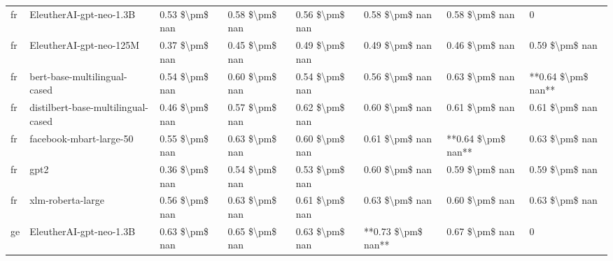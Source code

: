 \begin{tabular}{llllllll}
      fr &            EleutherAI-gpt-neo-1.3B & 0.53 \$\textbackslash pm\$ nan &            0.58 \$\textbackslash pm\$ nan &        0.56 \$\textbackslash pm\$ nan &         0.58 \$\textbackslash pm\$ nan &                          0.58 \$\textbackslash pm\$ nan &                  0 \\
      fr &            EleutherAI-gpt-neo-125M & 0.37 \$\textbackslash pm\$ nan &            0.45 \$\textbackslash pm\$ nan &        0.49 \$\textbackslash pm\$ nan &         0.49 \$\textbackslash pm\$ nan &                          0.46 \$\textbackslash pm\$ nan &     0.59 \$\textbackslash pm\$ nan \\
      fr &       bert-base-multilingual-cased & 0.54 \$\textbackslash pm\$ nan &            0.60 \$\textbackslash pm\$ nan &        0.54 \$\textbackslash pm\$ nan &         0.56 \$\textbackslash pm\$ nan &                          0.63 \$\textbackslash pm\$ nan & **0.64 \$\textbackslash pm\$ nan** \\
      fr & distilbert-base-multilingual-cased & 0.46 \$\textbackslash pm\$ nan &            0.57 \$\textbackslash pm\$ nan &        0.62 \$\textbackslash pm\$ nan &         0.60 \$\textbackslash pm\$ nan &                          0.61 \$\textbackslash pm\$ nan &     0.61 \$\textbackslash pm\$ nan \\
      fr &            facebook-mbart-large-50 & 0.55 \$\textbackslash pm\$ nan &            0.63 \$\textbackslash pm\$ nan &        0.60 \$\textbackslash pm\$ nan &         0.61 \$\textbackslash pm\$ nan &                      **0.64 \$\textbackslash pm\$ nan** &     0.63 \$\textbackslash pm\$ nan \\
      fr &                               gpt2 & 0.36 \$\textbackslash pm\$ nan &            0.54 \$\textbackslash pm\$ nan &        0.53 \$\textbackslash pm\$ nan &         0.60 \$\textbackslash pm\$ nan &                          0.59 \$\textbackslash pm\$ nan &     0.59 \$\textbackslash pm\$ nan \\
      fr &                  xlm-roberta-large & 0.56 \$\textbackslash pm\$ nan &            0.63 \$\textbackslash pm\$ nan &        0.61 \$\textbackslash pm\$ nan &         0.63 \$\textbackslash pm\$ nan &                          0.60 \$\textbackslash pm\$ nan &     0.63 \$\textbackslash pm\$ nan \\
      ge &            EleutherAI-gpt-neo-1.3B & 0.63 \$\textbackslash pm\$ nan &            0.65 \$\textbackslash pm\$ nan &        0.63 \$\textbackslash pm\$ nan &     **0.73 \$\textbackslash pm\$ nan** &                          0.67 \$\textbackslash pm\$ nan &                  0 \\

\end{tabular}
